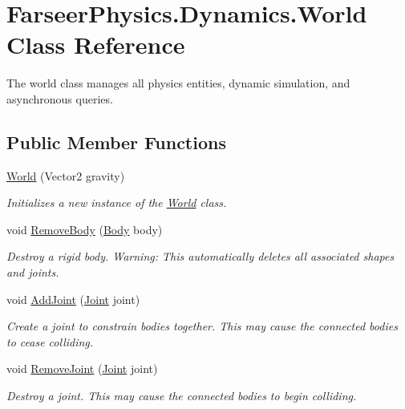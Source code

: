 \hypertarget{class_farseer_physics_1_1_dynamics_1_1_world}{\section{Farseer\+Physics.\+Dynamics.\+World Class Reference}
\label{class_farseer_physics_1_1_dynamics_1_1_world}
}


The world class manages all physics entities, dynamic simulation, and asynchronous queries.  


\subsection*{Public Member Functions}
\begin{DoxyCompactItemize}
\item 
\hyperlink{class_farseer_physics_1_1_dynamics_1_1_world_abb77ebea65e884c3e11583aef171610a}{World} (Vector2 gravity)
\begin{DoxyCompactList}\small\item\em Initializes a new instance of the \hyperlink{class_farseer_physics_1_1_dynamics_1_1_world}{World} class. \end{DoxyCompactList}\item 
void \hyperlink{class_farseer_physics_1_1_dynamics_1_1_world_a5f6ddee490706eb7d167ea79e80f09d8}{Remove\+Body} (\hyperlink{class_farseer_physics_1_1_dynamics_1_1_body}{Body} body)
\begin{DoxyCompactList}\small\item\em Destroy a rigid body. Warning\+: This automatically deletes all associated shapes and joints. \end{DoxyCompactList}\item 
void \hyperlink{class_farseer_physics_1_1_dynamics_1_1_world_aa0c260d943c03fc4107a54df9af72538}{Add\+Joint} (\hyperlink{class_farseer_physics_1_1_dynamics_1_1_joints_1_1_joint}{Joint} joint)
\begin{DoxyCompactList}\small\item\em Create a joint to constrain bodies together. This may cause the connected bodies to cease colliding. \end{DoxyCompactList}\item 
void \hyperlink{class_farseer_physics_1_1_dynamics_1_1_world_a4cf26af5b264f6e61d39a1c9334bf23f}{Remove\+Joint} (\hyperlink{class_farseer_physics_1_1_dynamics_1_1_joints_1_1_joint}{Joint} joint)
\begin{DoxyCompactList}\small\item\em Destroy a joint. This may cause the connected bodies to begin colliding. \end{DoxyCompactList}\item 

\end{DoxyCompactItemize}
